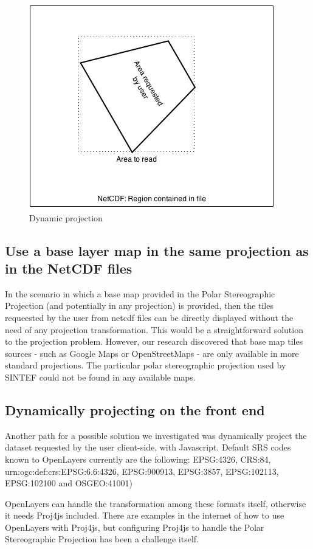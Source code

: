 \documentclass[11pt,a4paper,titlepage,oneside]{report}
\begin{document}
\begin{figure}[h]
\includegraphics{img/dynamic_projection.png}
  \caption{Dynamic projection}
    \label{fig:tileMatrixSet}
\end{figure}

\subsection{Use a base layer map in the same projection as in the NetCDF files}
In the scenario in which a base map provided in the Polar Stereographic Projection (and potentially in any projection) is provided, then the tiles requeested by the user from \gls{netcdf} files can be directly displayed without the need of any projection transformation. This would be a straightforward solution to the projection problem.
However, our research discovered that base map tiles sources - such as Google Maps or OpenStreetMaps - are only available in more standard projections. The particular polar stereographic projection used by SINTEF could not be found in any available maps.

\subsection{Dynamically projecting on the front end}
\label{subsec:DynamicProj}
Another path for a possible solution we investigated was dynamically project the dataset requested by the user client-side, with Javascript. 
Default SRS codes known to OpenLayers currently are the following:
EPSG:4326, CRS:84, urn:ogc:def:crs:EPSG:6.6:4326, EPSG:900913, EPSG:3857, EPSG:102113, EPSG:102100 and OSGEO:41001)

OpenLayers can handle the transformation among these formats itself, otherwise it needs Proj4js included.
There are examples in the internet of how to use OpenLayers with Proj4js, but configuring Proj4js to handle the Polar Stereographic Projection has been a challenge itself.
\end{document}
